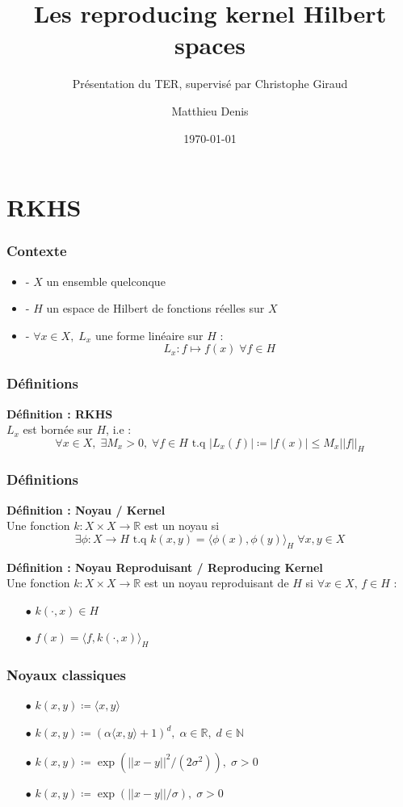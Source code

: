 \documentclass[aspectratio=169]{beamer}
\title{Les reproducing kernel Hilbert spaces}
\subtitle{Présentation du TER, supervisé par Christophe Giraud}
\author[Matthieu Denis]{Matthieu Denis}
\date{\today}
\institute{Université Paris Saclay}
\begin{document}
	
\begin{frame}
	\titlepage
\end{frame}

\section{RKHS}

\begin{frame}
	\frametitle{Contexte}
	\begin{itemize}
		\item-\; $X$ un ensemble quelconque
		\item -\; $H$ un espace de Hilbert de fonctions réelles sur $X$
		\item -\; $\forall x \in X, \; L_x$ une forme linéaire sur $H$ : \[L_x : f \mapsto f(x) \; \forall f \in H\]
	\end{itemize}
\end{frame}

\begin{frame}
	\frametitle{Définitions}
		{\bf Définition : RKHS}\\
		
		 $L_x$ est bornée sur $H$, i.e :
		\[\forall x \in X, \;  \exists M_x > 0, \; \forall f \in H \text{ t.q } |L_x(f)| \coloneqq |f(x)| \leq M_x ||f||_H\]
\end{frame}

\begin{frame}
	\frametitle{Définitions}
	
	{\bf Définition : Noyau / Kernel}\\
	
	Une fonction $k : X \times X \to \mathbb{R}$ est un noyau si
	\[ \exists \phi : X \to H \text{ t.q } k(x,y) = \langle \phi (x), \phi(y) \rangle_H \; \forall x,y \in X \]
	
	\pause
	
	{\bf Définition : Noyau Reproduisant / Reproducing Kernel}\\
	
	Une fonction $k : X \times X \to \mathbb{R}$ est un noyau reproduisant de $H$ si $\forall x \in X, \, f \in H$ :
	\begin{itemize}
		\item[$\bullet$] $k(\cdot, x) \in H$			
		\item[$\bullet$] $f(x) = \langle f, k(\cdot, x) \rangle_H$
	\end{itemize}
\end{frame}

\begin{frame}
	\frametitle{Noyaux classiques}
	\begin{itemize}
		\item[$\bullet$] $k(x, y) \coloneqq \langle x, y \rangle$
		\item[$\bullet$] $k(x, y) \coloneqq (\alpha \langle x, y \rangle + 1)^d, \; \alpha \in \mathbb{R}, \; d \in \mathbb{N}$
		\item[$\bullet$] $k(x, y) \coloneqq \exp(||x-y||^2 / (2\sigma^2)), \; \sigma > 0$
		\item[$\bullet$] $k(x, y) \coloneqq \exp(||x-y|| / \sigma), \; \sigma > 0$
	\end{itemize}
\end{frame}
\end{document}
